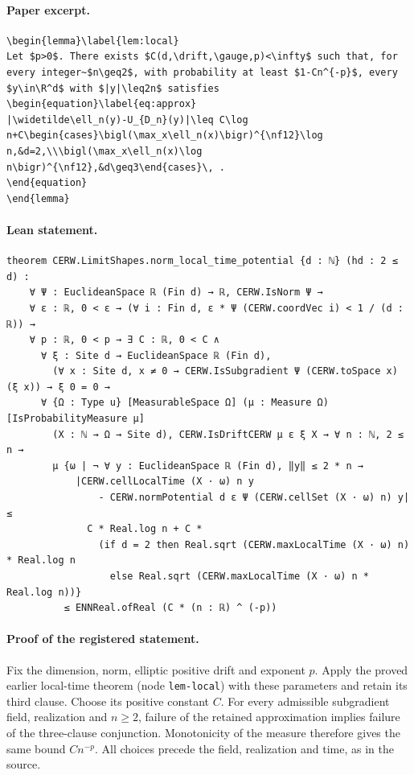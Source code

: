 \paragraph{Paper excerpt.}
\begin{verbatim}
\begin{lemma}\label{lem:local}
Let $p>0$. There exists $C(d,\drift,\gauge,p)<\infty$ such that, for every integer~$n\geq2$, with probability at least $1-Cn^{-p}$, every $y\in\R^d$ with $|y|\leq2n$ satisfies
\begin{equation}\label{eq:approx}
|\widetilde\ell_n(y)-U_{D_n}(y)|\leq C\log n+C\begin{cases}\bigl(\max_x\ell_n(x)\bigr)^{\nf12}\log n,&d=2,\\\bigl(\max_x\ell_n(x)\log n\bigr)^{\nf12},&d\geq3\end{cases}\, .
\end{equation}
\end{lemma}
\end{verbatim}
\paragraph{Lean statement.}
\begin{verbatim}
theorem CERW.LimitShapes.norm_local_time_potential {d : ℕ} (hd : 2 ≤ d) :
    ∀ Ψ : EuclideanSpace ℝ (Fin d) → ℝ, CERW.IsNorm Ψ →
    ∀ ε : ℝ, 0 < ε → (∀ i : Fin d, ε * Ψ (CERW.coordVec i) < 1 / (d : ℝ)) →
    ∀ p : ℝ, 0 < p → ∃ C : ℝ, 0 < C ∧
      ∀ ξ : Site d → EuclideanSpace ℝ (Fin d),
        (∀ x : Site d, x ≠ 0 → CERW.IsSubgradient Ψ (CERW.toSpace x) (ξ x)) → ξ 0 = 0 →
      ∀ {Ω : Type u} [MeasurableSpace Ω] (μ : Measure Ω) [IsProbabilityMeasure μ]
        (X : ℕ → Ω → Site d), CERW.IsDriftCERW μ ε ξ X → ∀ n : ℕ, 2 ≤ n →
        μ {ω | ¬ ∀ y : EuclideanSpace ℝ (Fin d), ‖y‖ ≤ 2 * n →
            |CERW.cellLocalTime (X · ω) n y
                - CERW.normPotential d ε Ψ (CERW.cellSet (X · ω) n) y| ≤
              C * Real.log n + C *
                (if d = 2 then Real.sqrt (CERW.maxLocalTime (X · ω) n) * Real.log n
                  else Real.sqrt (CERW.maxLocalTime (X · ω) n * Real.log n))}
          ≤ ENNReal.ofReal (C * (n : ℝ) ^ (-p))
\end{verbatim}
\paragraph{Proof of the registered statement.}
Fix the dimension, norm, elliptic positive drift and exponent $p$.
Apply the proved earlier local-time theorem (node \texttt{lem-local}) with these
parameters and retain its third clause. Choose its positive constant $C$.
For every admissible subgradient field, realization and $n\geq2$, failure of
the retained approximation implies failure of the three-clause conjunction.
Monotonicity of the measure therefore gives the same bound $Cn^{-p}$.
All choices precede the field, realization and time, as in the source.
